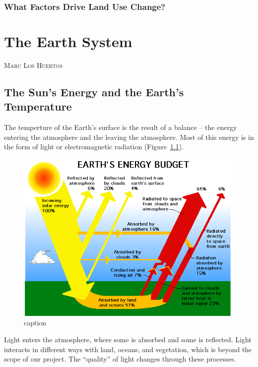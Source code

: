 \documentclass{book}\usepackage{knitr}
\makeatletter
\newcommand{\chapterauthor}[1]{%
  {\parindent0pt\vspace*{-25pt}%
  \linespread{1.1}\large\scshape#1%
  \par\nobreak\vspace*{35pt}}
  \@afterheading%
}
\makeatother
\begin{document}
\subsection{What Factors Drive Land Use Change?}





\mainmatter


\chapter{The Earth System}\label{earthsystem}

\chapterauthor{Marc Los Huertos}

\section{The Sun's Energy and the Earth's Temperature}

The temperture of the Earth's surface is the result of a balance -- the energy entering the atmosphere and the leaving the atmosphere. Most of this energy is in the form of light or electromagnetic radiation (Figure~\ref{fig:earthbudget}). 

\begin{figure}
\includegraphics[width=\linewidth]{images/earth-system/earth-rad-budget-nasa-erbe.png}
\caption{caption}
\label{fig:earthbudget}
\end{figure}

Light enters the atmosphere, where some is absorbed and some is reflected. Light interacts in different ways with land, oceans, and vegetation, which is beyond the scope of our project. The ``quality'' of light changes through these processes. 
\end{document}
